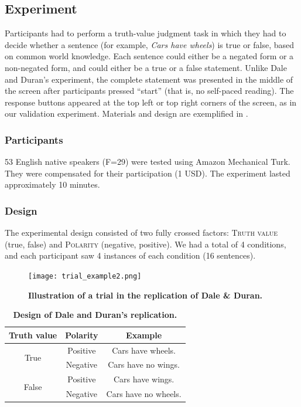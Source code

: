 \documentclass[11pt]{article}
\begin{document}
\subsection{Experiment}
Participants had to perform a truth-value judgment task in which they had to decide whether a sentence (for example, \textit{Cars have wheels}) is true or false, based on common world knowledge. Each sentence could either be a negated form or a non-negated form, and could either be a true or a false statement.
Unlike Dale and Duran's experiment, the complete statement was presented in the middle of the screen after participants pressed ``start'' (that is, no self-paced reading). The response buttons appeared at the top left or top right corners of the screen, as in our validation experiment.  
Materials and design are exemplified in . 

\subsubsection{Participants}
53 English native speakers (F=29) were tested using Amazon Mechanical Turk. They were compensated for their participation (1 USD). The experiment lasted approximately 10 minutes. 

\subsubsection{Design}
The experimental design consisted of two fully crossed factors: \textsc{Truth value} (true, false) and \textsc{Polarity} (negative, positive). We had a total of 4 conditions, and each participant saw 4 instances of each condition (16 sentences). 


\begin{figure}
\centering
\texttt{[image: trial\_example2.png]}
\caption{\textbf{Illustration of a trial in the replication of Dale \& Duran.}}
\end{figure}



\begin{table}[h]
\centering
\begin{tabular}{ccc}
Truth value & Polarity & Example \\
\hline
\multirow{2}{*}{True} & Positive & Cars have wheels.\\ 
 & Negative & Cars have no wings.\\ 
\hline
\multirow{2}{*}{False} & Positive & Cars have wings.\\ 
 & Negative & Cars have no wheels.\\
\end{tabular}
\caption{\textbf{Design of Dale and Duran's replication.}} \label{table:exampleDD}
\end{table}
\end{document}
